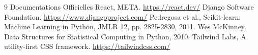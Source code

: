 \documentclass[12pt, a4paper]{report}
\begin{document}
\begin{thebibliography}{9}
Documentations Officielles React, META. \url{https://react.dev/}
Django Software Foundation. \url{https://www.djangoproject.com/}
Pedregosa et al., Scikit-learn: Machine Learning in Python, JMLR 12, pp. 2825-2830, 2011.
Wes McKinney. Data Structures for Statistical Computing in Python, 2010.
Tailwind Labs, A utility-first CSS framework. \url{https://tailwindcss.com/}
\end{thebibliography}
\end{document}
